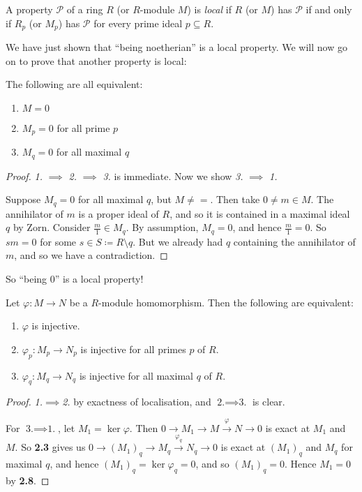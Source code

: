 \documentclass[10pt,a4paper]{article}
\begin{document}
\begin{definition}
  A property $\mathscr{P}$ of a ring $R$ (or $R$-module $M$) is \emph{local} if $R$ (or $M$) has $\mathscr{P}$ if and only if $R_p$ (or $M_p$) has $\mathscr{P}$ for every prime ideal $p \subseteq R$.
\end{definition}
We have just shown that ``being noetherian'' is a local property. We will now go on to prove that another property is local:
\begin{lemma}
  The following are all equivalent:
  \begin{enumerate}
    \item $M=0$
    \item $M_p = 0$ for all prime $p$
    \item $M_q = 0$ for all maximal $q$
  \end{enumerate}
\end{lemma}
\begin{proof}
  \textit{1.} $\implies$ \textit{2.} $\implies$ \textit{3.} is immediate. Now we show \textit{3.} $\implies$ \textit{1.}

  Suppose $M_q = 0$ for all maximal $q$, but $M \neq =$. Then take $0 \neq m \in M$. The annihilator of $m$ is a proper ideal of $R$, and so it is contained in a maximal ideal $q$ by Zorn. Consider $\frac{m}{1} \in M_q$. By assumption, $M_q =0$, and hence $\frac{m}{1} = 0$. So $sm =0$ for some $s \in S\coloneqq R\setminus q$. But we already had $q$ containing the annihilator of $m$, and so we have a contradiction.
\end{proof}
So ``being 0'' is a local property!
\begin{lemma}
  Let $\varphi:M \to N$ be a $R$-module homomorphism. Then the following are equivalent:
  \begin{enumerate}
    \item $\varphi$ is injective.
    \item $\varphi_p:M_p \to N_p$ is injective for all primes $p$ of $R$.
    \item $\varphi_q:M_q \to N_q$ is injective for all maximal $q$ of $R$.
  \end{enumerate}
\end{lemma}
\begin{proof}
  \textit{1.}$\implies$\textit{2.} by exactness of localisation, and $\textit{2.}\implies\textit{3.}$ is clear.

  For $\textit{3.}\implies\textit{1.}$, let $M_1 = \ker \varphi$. Then $0 \to M_1 \to M \xrightarrow{\varphi} N \to 0$ is exact at $M_1$ and $M$. So \textbf{2.3} gives us $0 \to (M_1)_q \to M_q \xrightarrow{\varphi_q} N_q \to 0$ is exact at $(M_1)_q$ and $M_q$ for maximal $q$, and hence $(M_1)_q = \ker \varphi_q = 0$, and so $(M_1)_q =0$. Hence $M_1 = 0$ by \textbf{2.8}.
\end{proof}
\end{document}
